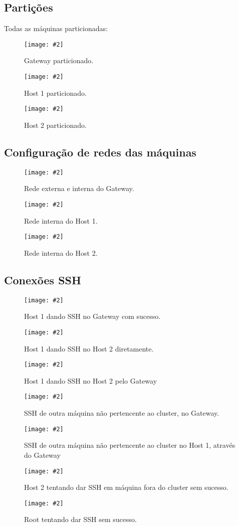 \documentclass[
	12pt,				%
	openany,			%
	a4paper,			%
	chapter=TITLE,		%
	section=TITLE,		%
	english,
	brazil				%
]{abntex2}
\newcommand{\includeImage}[3] {

\begin{figure}[H]
 	 \centering
  		\texttt{[image: \#2]}
  	\caption{#3}
\end{figure}

}
\begin{document}
\subsection{Partições}

Todas as máquinas particionadas:

\includeImage{0.65}{imgs/testes/1-gateway_particoes.png}{Gateway particionado.}

\includeImage{0.6}{imgs/testes/1-host1_particoes.png}{Host 1 particionado.}

\includeImage{0.6}{imgs/testes/1-host2_particoes.png}{Host 2 particionado.}

\subsection{Configuração de redes das máquinas}

\includeImage{0.6}{imgs/testes/2-gateway_rede_interna_e_externa.png}{Rede externa e interna do Gateway.}

\includeImage{0.6}{imgs/testes/2-host1_rede_interna.png}{Rede interna do Host 1.}

\includeImage{0.6}{imgs/testes/2-host2_rede_interna.png}{Rede interna do Host 2.}

\subsection{Conexões SSH}

\includeImage{0.6}{imgs/testes/3-host1_consegue_dar_ssh_no_gateway.png}{Host 1 dando SSH no Gateway com sucesso.}

\includeImage{0.6}{imgs/testes/3-host1_dando_ssh_no_host2_com_sucesso.png}{Host 1 dando SSH no Host 2 diretamente.}

\includeImage{0.6}{imgs/testes/3-host1_dando_ssh_no_gateway_e_depois_no_host2.png}{Host 1 dando SSH no Host 2 pelo Gateway}

\includeImage{0.6}{imgs/testes/3-dando_ssh_de_outra_maquina_no_gateway.png}{SSH de outra máquina não pertencente ao cluster, no Gateway.}

\includeImage{0.6}{imgs/testes/3-dando_ssh_de_outra_maquina_no_host1_pelo_gateway.png}{SSH de outra máquina não pertencente ao cluster no Host 1, através do Gateway}

\includeImage{0.7}{imgs/testes/3-host2_nao_consegue_dar_ssh_em_maquina_fora_do_cluster.png}{Host 2 tentando dar SSH em máquina fora do cluster sem sucesso.}

\includeImage{0.6}{imgs/testes/5-root_tentando_dar_ssh_sem_sucesso.png}{Root tentando dar SSH sem sucesso.}
\end{document}
